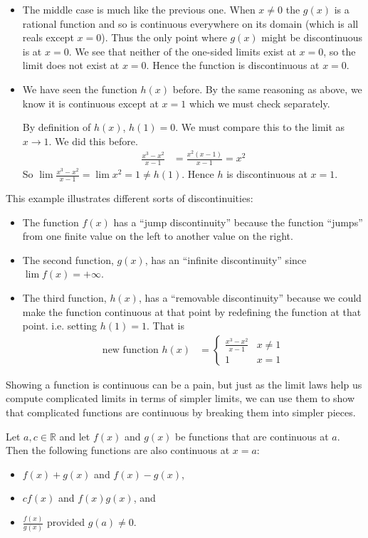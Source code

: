 \begin{eg}
\begin{itemize}
\item The middle case is much like the previous one. When $x \neq 0$ the $g(x)$
is a rational function and so is continuous everywhere on its domain (which is
all reals except $x=0$). Thus the only point where $g(x)$ might be discontinuous is at
$x=0$. We see that neither of the one-sided limits exist at $x=0$, so the limit
does not exist at $x=0$. Hence the function is discontinuous at $x=0$.

\item We have seen the function $h(x)$ before. By the same reasoning as
above, we know it is continuous except at $x=1$ which we must check separately.

By definition of $h(x)$, $h(1) = 0$. We must compare this to the limit as $x
\to 1$. We did this before.
\begin{align*}
	\frac{x^3-x^2}{x-1} &= \frac{x^2(x-1)}{x-1} = x^2
\end{align*}
So $\lim \frac{x^3-x^2}{x-1} = \lim x^2 = 1\neq h(1)$. Hence $h$
is discontinuous at $x=1$.
\end{itemize}
\end{eg}

This example illustrates different sorts of discontinuities:
\begin{itemize}
\item The function $f(x)$ has a ``jump discontinuity'' because the function
``jumps'' from one finite value on the left to another value on the right.
\item The second function, $g(x)$, has an ``infinite discontinuity'' since
$\lim f(x) =+\infty$.
\item The third function, $h(x)$, has a ``removable discontinuity'' because we
could make the function continuous at that point by redefining the function at
that point. i.e. setting $h(1)=1$. That is
\begin{align*}
  \text{new function }h(x) &= \begin{cases}
    \frac{x^3-x^2}{x-1} & x\neq 1\\
    1 & x=1
    \end{cases}
\end{align*}
\end{itemize}


Showing a function is continuous can be a pain, but just as the limit laws help
us compute complicated limits in terms of simpler limits, we can use them to
show that complicated functions are continuous by breaking them into simpler
pieces.
\begin{theorem}\label{thm arith cont}
  Let $a,c \in \mathbb{R}$ and let $f(x)$ and $g(x)$ be functions that are
continuous at $a$. Then the following functions are also continuous at $x=a$:
\begin{itemize}
 \item $f(x) + g(x)$ and $f(x) - g(x)$,
 \item $c f(x)$ and $f(x) g(x)$, and
 \item $\frac{f(x)}{g(x)}$ provided $g(a) \neq 0$.
\end{itemize}
\end{theorem}

